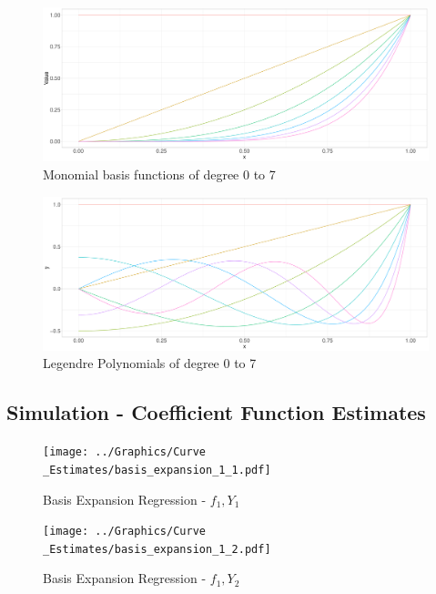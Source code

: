 \documentclass[11pt,twoside,a4paper]{article}
\begin{document}
	\begin{figure}[H]\label{monomial_basis}
		\includegraphics[width = \textwidth]{../Graphics/Monomial_Basis.pdf}
		\caption{Monomial basis functions of degree 0 to 7}
	\end{figure}

	\begin{figure}[H]\label{Legendre_basis}
		\includegraphics[width = \textwidth]{../Graphics/Legendre_Plot.pdf}
		\caption{Legendre Polynomials of degree 0 to 7}
	\end{figure}

	
	
	\newpage
	\subsection{Simulation - Coefficient Function Estimates}
	
	\begin{figure}[H]
		\centering
		\begin{minipage}{.5\textwidth}
			\centering
			\texttt{[image: ../Graphics/Curve\\\_Estimates/basis\_expansion\_1\_1.pdf]}
			\caption{Basis Expansion Regression - $f_1, Y_1$}
			\label{basis_expansion_1_1}
		\end{minipage}%
		\begin{minipage}{.5\textwidth}
			\centering
			\texttt{[image: ../Graphics/Curve\\\_Estimates/basis\_expansion\_1\_2.pdf]}
			\caption{Basis Expansion Regression - $f_1, Y_2$}
			\label{basis_expansion_1_2}
		\end{minipage}
	\end{figure}
	
\end{document}
